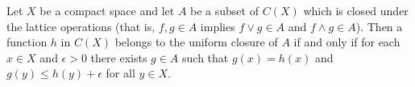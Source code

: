 Let $X$ be a compact space and let $A$ be a subset of $C(X)$ which is closed under the lattice operations (that is, $f, g \in A$ implies $f \vee g \in A$ and $f \wedge g \in A$). Then a function $h$ in $C(X)$ belongs to the uniform closure of $A$ if and only if for each $x \in X$ and $\epsilon > 0$ there exists $g \in A$ such that $g(x) = h(x)$ and $g(y) \leq h(y) + \epsilon$ for all $y \in X$.
